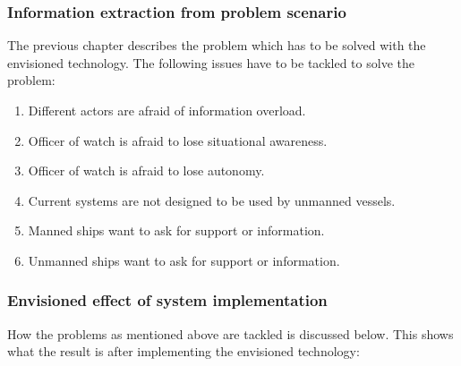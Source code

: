 \subsubsection{Information extraction from problem scenario}
The previous chapter describes the problem which has to be solved with the envisioned technology. The following issues have to be tackled to solve the problem:
\begin{spacing}{1}
	\begin{enumerate}
		\item Different actors are afraid of information overload.
		\item Officer of watch is afraid to lose situational awareness.
		\item Officer of watch is afraid to lose autonomy.
		\item Current systems are not designed to be used by unmanned vessels.
		\item Manned ships want to ask for support or information.
		\item Unmanned ships want to ask for support or information.
	\end{enumerate}
\end{spacing}

\subsubsection{Envisioned effect of system implementation}
How the problems as mentioned above are tackled is discussed below. This shows what the result is after implementing the envisioned technology:

